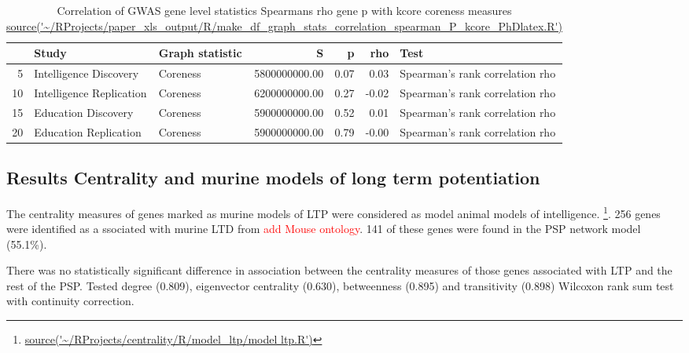\begin{table}[ht]
\centering
  \begin{adjustbox}{max width=\textwidth}
\begin{tabular}{rllrrrl}
  \hline
 & Study & Graph statistic & S & p & rho & Test \\ 
  \hline
5 & Intelligence Discovery & Coreness & 5800000000.00 & 0.07 & 0.03 & Spearman's rank correlation rho \\ 
  10 & Intelligence Replication & Coreness & 6200000000.00 & 0.27 & -0.02 & Spearman's rank correlation rho \\ 
  15 & Education Discovery & Coreness & 5900000000.00 & 0.52 & 0.01 & Spearman's rank correlation rho \\ 
  20 & Education Replication & Coreness & 5900000000.00 & 0.79 & -0.00 & Spearman's rank correlation rho \\ 
   \hline
\end{tabular}
\end{adjustbox}
\caption{Correlation of GWAS gene level statistics Spearmans rho gene p with kcore coreness measures \url{source('~/RProjects/paper_xls_output/R/make_df_graph_stats_correlation_spearman_P_kcore_PhDlatex.R')}} 
\label{Table:Correlation of GWAS gene level statistics Spearmans rho gene p  with kcorecoreness measures}
\end{table}






\subsection{Results Centrality and murine models of long term potentiation}
\label{sec:results centrality and murine models of long term potentiation}
    The centrality measures of genes marked as murine models of LTP were considered as model animal models of intelligence. \footnote{\url{source('~/RProjects/centrality/R/model_ltp/model ltp.R')}}.
    256 genes were identified as a
    ssociated with murine LTD from \textcolor{red}{add Mouse ontology}. 141 of these genes were found in the PSP network model (55.1\%).
    
    There was no statistically significant difference in association between the centrality measures of those genes associated with LTP and the rest of the PSP. Tested degree (0.809), eigenvector centrality (0.630), betweenness (0.895) and transitivity (0.898) Wilcoxon rank sum test with continuity correction. 
    
